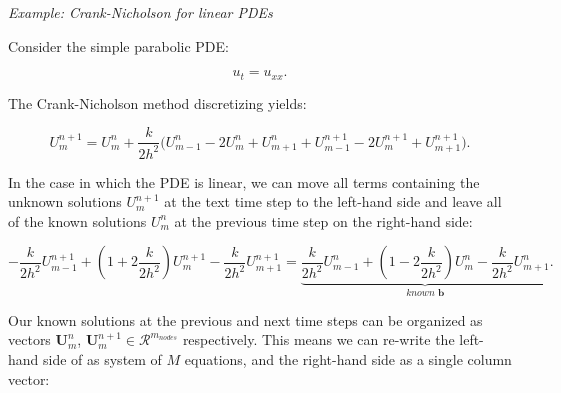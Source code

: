 \vspace{0.5cm}
\begin{tcolorbox}[colback=gray!5!white,colframe=gray!75!black]
\noindent \textit{Example: Crank-Nicholson for linear PDEs}
\vspace{0.25cm}

Consider the simple parabolic PDE: 

\begin{equation}\label{eq:heat_simple}
    u_t = u_{xx}. 
\end{equation}

The Crank-Nicholson method discretizing  yields: 

\begin{equation}
    U_m^{n+1} = U_m^{n} + \frac{k}{2h^2} \bigg(U_{m-1}^{n} - 2U_{m}^{n} + U_{m+1}^n + U_{m-1}^{n+1} - 2U_{m}^{n+1} + U_{m+1}^{n+1}\bigg). 
\end{equation}

In the case in which the PDE is linear, we can move all terms containing the unknown solutions $U_m^{n+1}$ at the text time step to the left-hand side and leave all of the known solutions $U_m^n$ at the previous time step on the right-hand side: 

\begin{equation}\label{eq:cranknic}
    -\frac{k}{2h^2}U_{m-1}^{n+1} + (1+2\frac{k}{2h^2})U_{m}^{n+1} - \frac{k}{2h^2}U_{m+1}^{n+1} = \underbrace{\frac{k}{2h^2}U_{m-1}^{n} + (1-2\frac{k}{2h^2})U_{m}^{n} - \frac{k}{2h^2}U_{m+1}^{n}}_{\textit{known }\boldsymbol{b}}.
\end{equation}

Our known solutions at the previous and next time steps can be organized as vectors $\boldsymbol{U}_{m}^{n}$, $\boldsymbol{U}_{m}^{n+1} \in \mathcal{R}^{m_{nodes}}$ respectively. This means we can re-write the left-hand side of  as system of $M$ equations, and the right-hand side as a single column vector: 


\end{tcolorbox}
